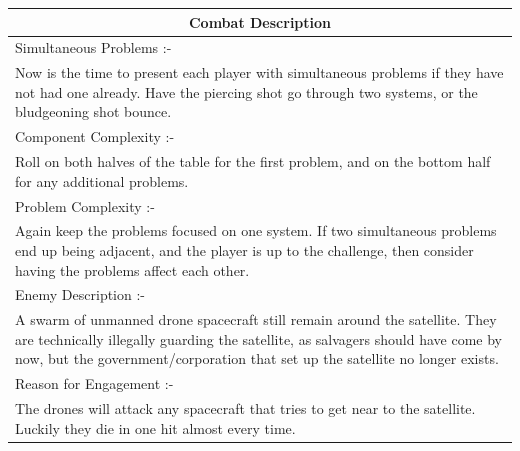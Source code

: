 \documentclass[a4paper]{article}
\begin{document}
\begin{minipage}[t]{0.5\linewidth}
\begin{tabular}[t]{| p{7cm} |}
\toprule
\multicolumn{1}{|c|}{Combat Description} \\
\midrule
Simultaneous Problems :- \\
Now is the time to present each player with simultaneous problems if they have not had one already. Have the piercing shot go through two systems, or the bludgeoning shot bounce. \\	
\midrule
Component Complexity :- \\
Roll on both halves of the table for the first problem, and on the bottom half for any additional problems. \\
\midrule
Problem Complexity :- \\
Again keep the problems focused on one system. If two simultaneous problems end up being adjacent, and the player is up to the challenge, then consider having the problems affect each other. \\
\midrule
Enemy Description :- \\
A swarm of unmanned drone spacecraft still remain around the satellite. They are technically illegally guarding the satellite, as salvagers should have come by now, but the government/corporation that set up the satellite no longer exists. \\
\midrule
Reason for Engagement :- \\
The drones will attack any spacecraft that tries to get near to the satellite. Luckily they die in one hit almost every time. \\
\bottomrule
\end{tabular}
\end{minipage}
\end{document}
